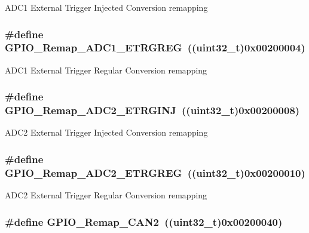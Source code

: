 \label{group__GPIO__Remap__define_gaf79d966f49b64d3feb0ba9cc39294dac}
ADC1 External Trigger Injected Conversion remapping \hypertarget{group__GPIO__Remap__define_gab1d040cab5d9f16f362edc2e8b47a82a}{
\subsubsection[{GPIO\_\-Remap\_\-ADC1\_\-ETRGREG}]{\setlength{\rightskip}{0pt plus 5cm}\#define GPIO\_\-Remap\_\-ADC1\_\-ETRGREG~((uint32\_\-t)0x00200004)}}
\label{group__GPIO__Remap__define_gab1d040cab5d9f16f362edc2e8b47a82a}
ADC1 External Trigger Regular Conversion remapping \hypertarget{group__GPIO__Remap__define_gae00aaabeed54e805932ec6978acf000d}{
\subsubsection[{GPIO\_\-Remap\_\-ADC2\_\-ETRGINJ}]{\setlength{\rightskip}{0pt plus 5cm}\#define GPIO\_\-Remap\_\-ADC2\_\-ETRGINJ~((uint32\_\-t)0x00200008)}}
\label{group__GPIO__Remap__define_gae00aaabeed54e805932ec6978acf000d}
ADC2 External Trigger Injected Conversion remapping \hypertarget{group__GPIO__Remap__define_gaa782a0c482f34507c82e4cd639bb747e}{
\subsubsection[{GPIO\_\-Remap\_\-ADC2\_\-ETRGREG}]{\setlength{\rightskip}{0pt plus 5cm}\#define GPIO\_\-Remap\_\-ADC2\_\-ETRGREG~((uint32\_\-t)0x00200010)}}
\label{group__GPIO__Remap__define_gaa782a0c482f34507c82e4cd639bb747e}
ADC2 External Trigger Regular Conversion remapping \hypertarget{group__GPIO__Remap__define_ga14c09a5050063b703fa07181afc56ee6}{
\subsubsection[{GPIO\_\-Remap\_\-CAN2}]{\setlength{\rightskip}{0pt plus 5cm}\#define GPIO\_\-Remap\_\-CAN2~((uint32\_\-t)0x00200040)}}
